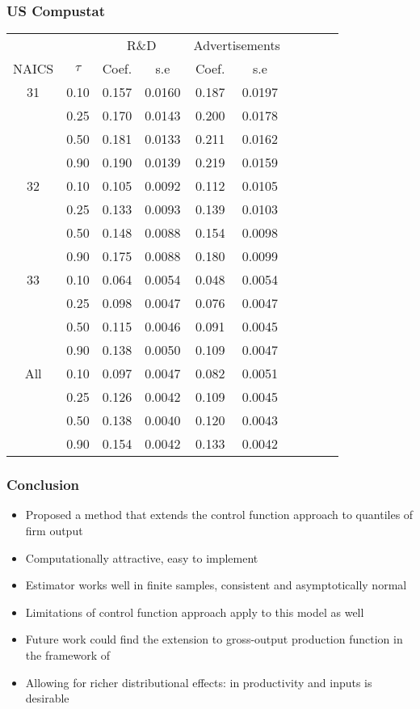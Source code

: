 \documentclass[xcolor={dvipsnames}, notheorems]{beamer}
\theoremstyle{plain}
\begin{document}
\begin{frame}
\frametitle{US Compustat}
\small
\centering
\begin{tabular}{cccccccccc}
  \hline\hline & & \multicolumn{2}{c}{R\&D}  & \multicolumn{2}{c}{Advertisements} \\ \cmidrule(lr){3-4} \cmidrule(lr){5-6}NAICS & $\tau$ & Coef. & s.e & Coef. & s.e \\ 
  \hline
31 & 0.10 & 0.157 & 0.0160 & 0.187 & 0.0197 \\ 
   & 0.25 & 0.170 & 0.0143 & 0.200 & 0.0178 \\ 
   & 0.50 & 0.181 & 0.0133 & 0.211 & 0.0162 \\ 
   & 0.90 & 0.190 & 0.0139 & 0.219 & 0.0159 \\ 
  32 & 0.10 & 0.105 & 0.0092 & 0.112 & 0.0105 \\ 
   & 0.25 & 0.133 & 0.0093 & 0.139 & 0.0103 \\ 
   & 0.50 & 0.148 & 0.0088 & 0.154 & 0.0098 \\ 
   & 0.90 & 0.175 & 0.0088 & 0.180 & 0.0099 \\ 
  33 & 0.10 & 0.064 & 0.0054 & 0.048 & 0.0054 \\ 
   & 0.25 & 0.098 & 0.0047 & 0.076 & 0.0047 \\ 
   & 0.50 & 0.115 & 0.0046 & 0.091 & 0.0045 \\ 
   & 0.90 & 0.138 & 0.0050 & 0.109 & 0.0047 \\ 
  All & 0.10 & 0.097 & 0.0047 & 0.082 & 0.0051 \\ 
   & 0.25 & 0.126 & 0.0042 & 0.109 & 0.0045 \\ 
   & 0.50 & 0.138 & 0.0040 & 0.120 & 0.0043 \\ 
   & 0.90 & 0.154 & 0.0042 & 0.133 & 0.0042 \\ 
   \hline
\end{tabular}
\end{frame}


\begin{frame}
\frametitle{Conclusion}
\begin{itemize}
	\item Proposed a method that extends the control function approach to quantiles of firm output
	\item Computationally attractive, easy to implement
	\item Estimator works well in finite samples, consistent and asymptotically normal
	\item Limitations of control function approach apply to this model as well
	\item Future work could find the extension to gross-output production function in the framework of \cite{Gandhi2020}
	\item Allowing for richer distributional effects: in productivity and inputs is desirable
\end{itemize}
\end{frame}


\end{document}
